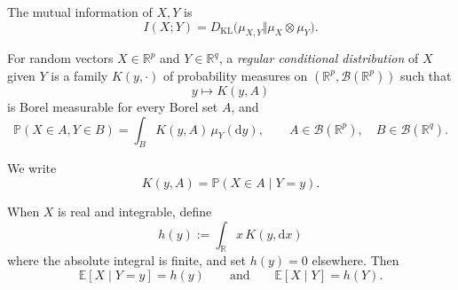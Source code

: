 \begin{definition}
The mutual information of $X,Y$ is
\[
I(X;Y)
=
D_{\mathrm{KL}}
\bigl(\mu_{X,Y}\Vert \mu_X\otimes\mu_Y\bigr).
\]
\end{definition}

\begin{definition}
For random vectors $X\in\mathbb{R}^p$ and $Y\in\mathbb{R}^q$, a
\emph{regular conditional distribution} of $X$ given $Y$ is a family
$K(y,\cdot)$ of probability measures on
$(\mathbb{R}^p,\mathcal{B}(\mathbb{R}^p))$ such that
\[
y\longmapsto K(y,A)
\]
is Borel measurable for every Borel set $A$, and
\begin{equation}
\mathbb{P}(X\in A,Y\in B)
=
\int_B K(y,A)\,\mu_Y(\mathrm{d}y),
\qquad
A\in\mathcal{B}(\mathbb{R}^p),\quad
B\in\mathcal{B}(\mathbb{R}^q).
\end{equation}

We write
\[
K(y,A)=\mathbb{P}(X\in A\mid Y=y).
\]

When $X$ is real and integrable, define
\[
h(y):=\int_{\mathbb{R}}x\,K(y,\mathrm{d}x)
\]
where the absolute integral is finite, and set $h(y)=0$ elsewhere. Then
\[
\mathbb{E}[X\mid Y=y]=h(y)
\qquad\text{and}\qquad
\mathbb{E}[X\mid Y]=h(Y).
\]
\end{definition}

